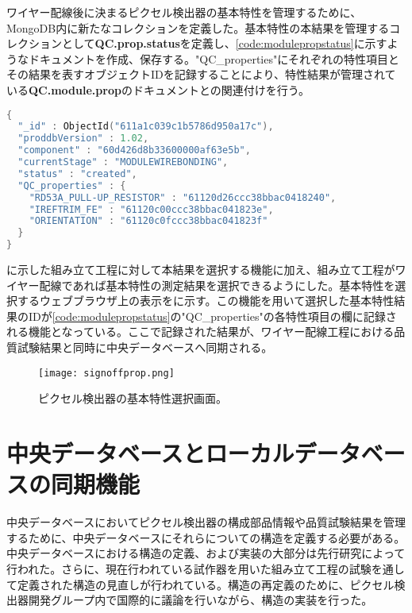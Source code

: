 ワイヤー配線後に決まるピクセル検出器の基本特性を管理するために、MongoDB内に新たなコレクションを定義した。基本特性の本結果を管理するコレクションとして\textbf{QC.prop.status}を定義し、\cref{code:modulepropstatus}に示すようなドキュメントを作成、保存する。"QC\_properties"にそれぞれの特性項目とその結果を表すオブジェクトIDを記録することにより、特性結果が管理されている\textbf{QC.module.prop}のドキュメントとの関連付けを行う。


\begin{lstlisting}[caption=ピクセル検出器の組み立て工程を管理するためのドキュメントの一部。,label=code:modulepropstatus, language=C++]
{
  "_id" : ObjectId("611a1c039c1b5786d950a17c"),
  "proddbVersion" : 1.02,
  "component" : "60d426d8b33600000af63e5b",
  "currentStage" : "MODULEWIREBONDING",
  "status" : "created",
  "QC_properties" : {
    "RD53A_PULL-UP_RESISTOR" : "61120d26ccc38bbac0418240",
    "IREFTRIM_FE" : "61120c00ccc38bbac041823e",
    "ORIENTATION" : "61120c0fccc38bbac041823f"
  }
}
\end{lstlisting}

に示した組み立て工程に対して本結果を選択する機能に加え、組み立て工程がワイヤー配線であれば基本特性の測定結果を選択できるようにした。基本特性を選択するウェブブラウザ上の表示をに示す。この機能を用いて選択した基本特性結果のIDが\cref{code:modulepropstatus}の"QC\_properties"の各特性項目の欄に記録される機能となっている。ここで記録された結果が、ワイヤー配線工程における品質試験結果と同時に中央データベースへ同期される。

\begin{figure}[tbp]
  \centering
  \texttt{[image: signoffprop.png]}
  \caption[ピクセル検出器の基本特性選択画面]{ピクセル検出器の基本特性選択画面。}
  \label{fig:sign-off-prop}
\end{figure}

\section{中央データベースとローカルデータベースの同期機能}
\label{sec:douki}

中央データベースにおいてピクセル検出器の構成部品情報や品質試験結果を管理するために、中央データベースにそれらについての構造を定義する必要がある。中央データベースにおける構造の定義、および実装の大部分は先行研究\cite{oku}によって行われた。さらに、現在行われている試作器を用いた組み立て工程の試験を通して定義された構造の見直しが行われている。構造の再定義のために、ピクセル検出器開発グループ内で国際的に議論を行いながら、構造の実装を行った。

